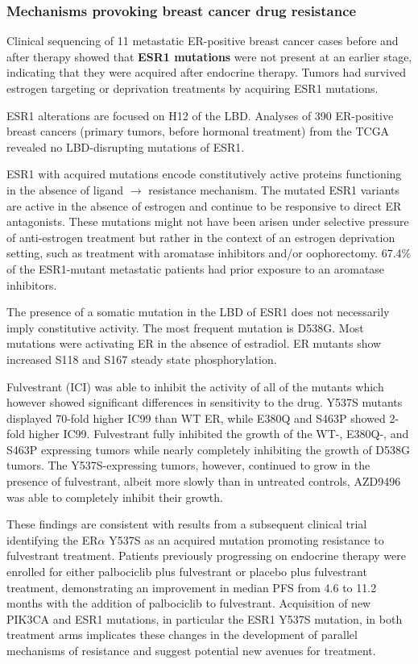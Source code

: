 \hypertarget{mechanisms-provoking-breast-cancer-drug-resistance}{%
\subsubsection{Mechanisms provoking breast cancer drug resistance}\label{mechanisms-provoking-breast-cancer-drug-resistance}}

Clinical sequencing of 11 metastatic ER-positive breast cancer cases before and after therapy showed that \textbf{ESR1 mutations} were not present at an earlier stage, indicating that they were acquired after endocrine therapy. Tumors had survived estrogen targeting or deprivation treatments by acquiring ESR1 mutations.

ESR1 alterations are focused on H12 of the LBD. Analyses of 390 ER-positive breast cancers (primary tumors, before hormonal treatment) from the TCGA revealed no LBD-disrupting mutations of ESR1.

ESR1 with acquired mutations encode constitutively active proteins functioning in the absence of ligand $\rightarrow$ resistance mechanism. The mutated ESR1 variants are active in the absence of estrogen and continue to be responsive to direct ER antagonists. These mutations might not have been arisen under selective pressure of anti-estrogen treatment but rather in the context of an estrogen deprivation setting, such as treatment with aromatase inhibitors and/or oophorectomy. 67.4\% of the ESR1-mutant metastatic patients had prior exposure to an aromatase inhibitors.

The presence of a somatic mutation in the LBD of ESR1 does not necessarily imply constitutive activity. The most frequent mutation is D538G. Most mutations were activating ER in the absence of estradiol. ER mutants show increased S118 and S167 steady state phosphorylation.

Fulvestrant (ICI) was able to inhibit the activity of all of the mutants which however showed significant differences in sensitivity to the drug. Y537S mutants displayed 70-fold higher IC99 than WT ER, while E380Q and S463P showed 2-fold higher IC99. Fulvestrant fully inhibited the growth of the WT-, E380Q-, and S463P expressing tumors while nearly completely inhibiting the growth of D538G tumors. The Y537S-expressing tumors, however, continued to grow in the presence of fulvestrant, albeit more slowly than in untreated controls, AZD9496 was able to completely inhibit their growth.

These findings are consistent with results from a subsequent clinical trial identifying the ER$\alpha$ Y537S as an acquired mutation promoting resistance to fulvestrant treatment.
Patients previously progressing on endocrine therapy were enrolled for either palbociclib plus fulvestrant or placebo plus fulvestrant treatment, demonstrating an improvement in median PFS from 4.6 to 11.2 months with the addition of palbociclib to fulvestrant. Acquisition of new PIK3CA and ESR1 mutations, in particular the ESR1 Y537S mutation, in both treatment arms implicates these changes in the development of parallel mechanisms of resistance and suggest potential new avenues for treatment.

